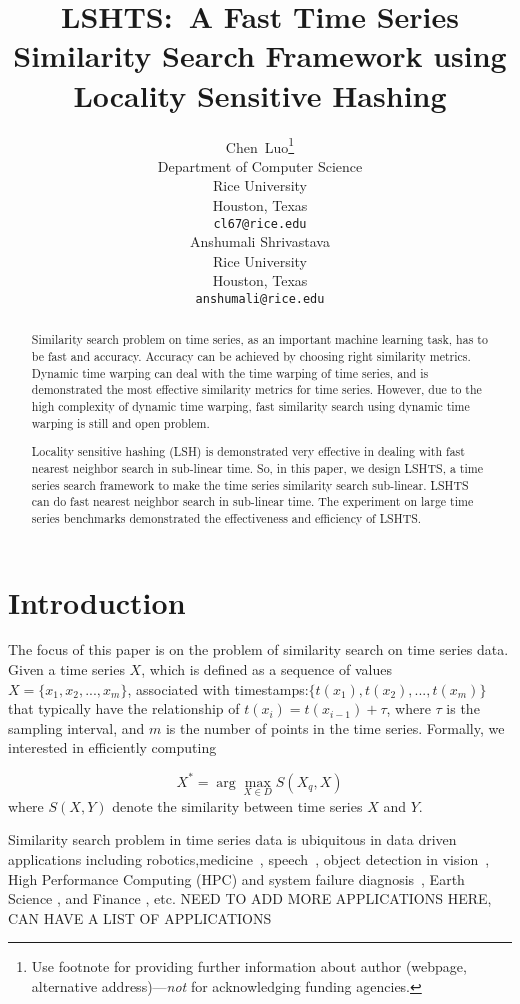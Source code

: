 \documentclass{article}
\title{LSHTS:~A Fast Time Series Similarity Search Framework using Locality Sensitive Hashing}
\author{
  Chen~Luo\thanks{Use footnote for providing further
    information about author (webpage, alternative
    address)---\emph{not} for acknowledging funding agencies.} \\
  Department of Computer Science\\
  Rice University\\
  Houston, Texas \\
  \texttt{cl67@rice.edu} \\
  \And
  Anshumali Shrivastava \\
  Rice University \\
  Houston, Texas \\
  \texttt{anshumali@rice.edu} \\
}
\begin{document}

\maketitle

\begin{abstract}
Similarity search problem on time series, as an important machine learning task, has to be fast and accuracy. Accuracy can be achieved by choosing right similarity metrics. 
Dynamic time warping can deal with the time warping of time series, and is demonstrated the most effective similarity metrics for time series. However, due to the high complexity of dynamic time warping, fast similarity search using dynamic time warping is still and open problem. 

Locality sensitive hashing (LSH) is demonstrated very effective in dealing with fast nearest neighbor search in sub-linear time. 
So, in this paper, we design LSHTS, a time series search framework to make the time series similarity search sub-linear. 
LSHTS can do fast nearest neighbor search in sub-linear time.
The experiment on large time series benchmarks demonstrated the effectiveness and efficiency of LSHTS.

\end{abstract}

\section{Introduction}

The focus of this paper is on the problem of similarity search on time series data.
Given a time series $X$, which is defined as a sequence of values $X = \{x_1,x_2,...,x_m\}$, associated with timestamps:$\{t(x_1), t(x_2),..., t(x_m)\}$ that typically have the relationship of $t(x_i) = t(x_{i-1})+\tau$, where $\tau$ is  the sampling interval, and $m$ is the number of points in the time series. Formally, we interested in efficiently computing

\begin{equation}
X^* = \arg \max_{X \in D} S(X_q,X)
\end{equation}
where $S(X,Y)$ denote the similarity between time series $X$ and $Y$. 

Similarity search problem in time series data is ubiquitous in data driven applications including robotics,medicine~\cite{oates2000method,caracca2000discovering}, speech~\cite{rabiner1993fundamentals}, object detection in vision~\cite{yang2002detecting, sonka2014image}, High Performance Computing (HPC) and system failure diagnosis~\cite{luo2014correlating,sun2014querying}, Earth Science \cite{mudelsee2013climate}, and Finance \cite{granger2014forecasting}, etc. 
{\color{Red} NEED TO ADD MORE APPLICATIONS HERE, CAN HAVE A LIST OF APPLICATIONS}
\end{document}
